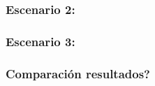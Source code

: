 \documentclass{article}
\begin{document}
\subsubsection{Escenario 2: }

\subsubsection{Escenario 3: }

\subsubsection{Comparación resultados?}

\end{document}
